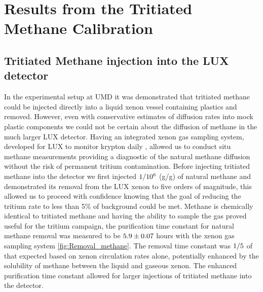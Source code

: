 \section{Results from the Tritiated Methane Calibration}

\subsection{Tritiated Methane injection into the LUX detector}

In the experimental setup at UMD it was demonstrated that tritiated methane could be injected directly into a liquid xenon vessel containing plastics and removed. However, even with conservative estimates of diffusion rates into mock plastic components we could not be certain about the diffusion of methane in the much larger LUX detector. Having an integrated xenon gas sampling system, developed for LUX to monitor krypton daily \cite{Kr_ppt_Dobi} \cite{EXO_SAM}, allowed us to conduct situ methane measurements providing a diagnostic of the natural methane diffusion without the risk of permanent tritium contamination. Before injecting tritiated methane into the detector we first injected $\rm 1/10^{6}$ (g/g) of natural methane and demonstrated its removal from the LUX xenon to five orders of magnitude, this allowed us to proceed with confidence knowing that the goal of reducing the tritium rate to less than 5\% of background could be met. Methane is chemically identical to tritiated methane and having the ability to sample the gas proved useful for the tritium campaign, the purification time constant for natural methane removal was measured to be $\rm 5.9 \pm 0.07$ hours with the xenon gas sampling system \ref{fig:Removal_methane}. The removal time constant was $\rm 1/5$ of that expected based on xenon circulation rates alone, potentially enhanced by the solubility of methane between the liquid and gaseous xenon. The enhanced purification time constant allowed for larger injections of tritiated methane into the detector. 


